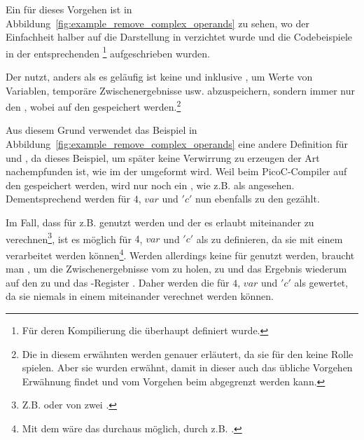 Ein  für dieses Vorgehen ist in Abbildung~\ref{fig:example_remove_complex_operands} zu sehen, wo der Einfachheit halber auf die Darstellung in  verzichtet wurde und die Codebeispiele in der entsprechenden \footnote{Für deren Kompilierung die  überhaupt definiert wurde.} aufgeschrieben wurden.

Der  nutzt, anders als es geläufig ist keine  und  inklusive , um Werte von Variablen, temporäre Zwischenergebnisse usw. abzuspeichern, sondern immer nur den , wobei  auf den  gespeichert werden.\footnote{Die in diesem  erwähnten  werden  genauer erläutert, da sie für den  keine Rolle spielen. Aber sie wurden erwähnt, damit in dieser  auch das übliche Vorgehen Erwähnung findet und vom Vorgehen beim  abgegrenzt werden kann.}

Aus diesem Grund verwendet das Beispiel in Abbildung~\ref{fig:example_remove_complex_operands} eine andere Definition für  und , da dieses Beispiel, um später keine Verwirrung zu erzeugen der Art nachempfunden ist, wie im  der  umgeformt wird. Weil beim PicoC-Compiler  auf den  gespeichert werden, wird nur noch ein , wie z.B.  als  angesehen. Dementsprechend werden  für  $4$,  $var$ und  $'c'$ nun ebenfalls zu den  gezählt.

Im Fall, dass  für z.B.  genutzt werden und der  es erlaubt  miteinander zu verechnen\footnote{Z.B.  oder  von zwei .}, ist es möglich  für  $4$,  $var$ und  $'c'$ als  zu definieren, da sie mit einem  verarbeitet werden können\footnote{Mit dem  wäre das durchaus möglich, durch z.B. .}. Werden allerdings keine  für  genutzt werden, braucht man , um die Zwischenergebnisse vom  zu holen, zu  und das Ergebnis wiederum auf den  zu  und das -Register . Daher werden die  für  $4$,  $var$ und  $'c'$ als  gewertet, da sie niemals in einem  miteinander verechnet werden können.

